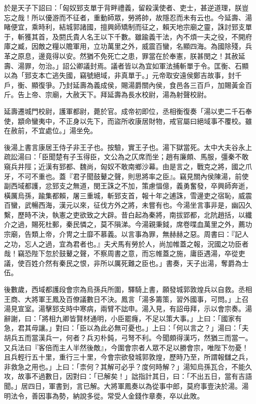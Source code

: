 \begin{pinyinscope}
於是天子下詔曰：「匈奴郅支單于背畔禮義，留殺漢使者、吏士，甚逆道理，朕豈忘之哉！所以優游而不征者，重動師眾，勞將帥，故隱忍而未有云也。今延壽、湯睹便宜，乘時利，結城郭諸國，擅興師矯制而征之，賴天地宗廟之靈，誅討郅支單于，斬獲其首，及閼氏貴人名王以下千數。雖踰義干法，內不煩一夫之役，不開府庫之臧，因敵之糧以贍軍用，立功萬里之外，威震百蠻，名顯四海。為國除殘，兵革之原息，邊竟得以安。然猶不免死亡之患，罪當在於奉憲，朕甚閔之！其赦延壽、湯罪，勿治。」詔公卿議封焉。議者皆以為宜如軍法捕斬單于令。匡衡、石顯以為「郅支本亡逃失國，竊號絕域，非真單于。」元帝取安遠侯鄭吉故事，封千戶，衡、顯復爭。乃封延壽為義成侯，賜湯爵關內侯，食邑各三百戶，加賜黃金百斤。告上帝、宗廟，大赦天下。拜延壽為長水校尉，湯為射聲校尉。

延壽遷城門校尉，護軍都尉，薨於官。成帝初即位，丞相衡復奏「湯以吏二千石奉使，顓命蠻夷中，不正身以先下，而盜所收康居財物，戒官屬曰絕域事不覆校。雖在赦前，不宜處位。」湯坐免。

後湯上書言康居王侍子非王子也。按驗，實王子也。湯下獄當死。太中大夫谷永上疏訟湯曰：「臣聞楚有子玉得臣，文公為之仄席而坐；趙有廉頗、馬服，彊秦不敢窺兵井陘；近漢有郅都、魏尚，匈奴不敢南鄉沙幕。由是言之，戰克之將，國之爪牙，不可不重也。蓋『君子聞鼓鼙之聲，則思將率之臣』。竊見關內侯陳湯，前使副西域都護，忿郅支之無道，閔王誅之不加，策慮愊億，義勇奮發，卒興師奔逝，橫厲烏孫，踰集都賴，屠三重城，斬郅支首，報十年之逋誅，雪邊吏之宿恥，威震百蠻，武暢西海，漢元以來，征伐方外之將，未嘗有也。今湯坐言事非是，幽囚久繫，歷時不決，執憲之吏欲致之大辟。昔白起為秦將，南拔郢都，北阬趙括，以纖介之過，賜死杜郵，秦民憐之，莫不隕涕。今湯親秉鉞，席卷喋血萬里之外，薦功宗廟，告類上帝，介冑之士靡不慕義。以言事為罪，無赫赫之惡。周書曰：『記人之功，忘人之過，宜為君者也。』夫犬馬有勞於人，尚加帷蓋之報，況國之功臣者哉！竊恐陛下忽於鼓鼙之聲，不察周書之意，而忘帷蓋之施，庸臣遇湯，卒從吏議，使百姓介然有秦民之恨，非所以厲死難之臣也。」書奏，天子出湯，奪爵為士伍。

後數歲，西域都護段會宗為烏孫兵所圍，驛騎上書，願發城郭敦煌兵以自救。丞相王商、大將軍王鳳及百僚議數日不決。鳳言「湯多籌策，習外國事，可問。」上召湯見宣室。湯擊郅支時中寒病，兩臂不詘申。湯入見，有詔毋拜，示以會宗奏。湯辭謝，曰：「將相九卿皆賢材通明，小臣罷癃，不足以策大事。」上曰：「國家有急，君其毋讓。」對曰：「臣以為此必無可憂也。」上曰：「何以言之？」湯曰：「夫胡兵五而當漢兵一，何者？兵刃朴鈍，弓弩不利。今聞頗得漢巧，然猶三而當一。又兵法曰『客倍而主人半然後敵』，今圍會宗者人眾不足以勝會宗，唯陛下勿憂！且兵輕行五十里，重行三十里，今會宗欲發城郭敦煌，歷時乃至，所謂報讎之兵，非救急之用也。」上曰：「柰何？其解可必乎？度何時解？」湯知烏孫瓦合，不能久攻，故事不過數日，因對曰：「已解矣！」詘指計其日，曰：「不出五日，當有吉語聞。」居四日，軍書到，言已解。大將軍鳳奏以為從事中郎，莫府事壹決於湯。湯明法令，善因事為勢，納說多從。常受人金錢作章奏，卒以此敗。


\end{pinyinscope}
